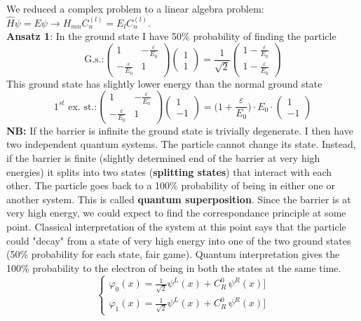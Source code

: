 We reduced a complex problem to a linear algebra problem: $\hat{H}\psi=E\psi \rightarrow H_{mn}C_n^{(l)}=E_lC_n^{(l)}$.\\
\newline
\textbf{Ansatz 1}: In the ground state I have 50\% probability of finding the particle
\[
\text{G.s.:}
\begin{pmatrix}
1 & -\frac{\varepsilon}{E_0}\\
-\frac{\varepsilon}{E_0} & 1
\end{pmatrix}
\begin{pmatrix}
1\\1
\end{pmatrix}
=
\frac{1}{\sqrt{2}}
\begin{pmatrix}
1-\frac{\varepsilon}{E_0}\\1-\frac{\varepsilon}{E_0}
\end{pmatrix}
\]
This ground state has slightly lower energy than the normal ground state
\[
\text{$1^{st}$ ex. st.:}
\begin{pmatrix}
1 & -\frac{\varepsilon}{E_0}\\
-\frac{\varepsilon}{E_0} & 1
\end{pmatrix}
\begin{pmatrix}
1\\-1
\end{pmatrix}
=
\biggl(1+\frac{\varepsilon}{E_0}\biggr)\cdot E_0 \cdot
\begin{pmatrix}
1\\-1
\end{pmatrix}
\]
\textbf{NB:} If the barrier is infinite the ground state is trivially degenerate. I then have two independent quantum systems. The particle cannot change its state. Instead, if the barrier is finite (slightly determined end of the barrier at very high energies) it splits into two states (\textbf{splitting states}) that interact with each other. The particle goes back to a 100\% probability of being in either one or another system. This is called \textbf{quantum superposition}.
\newline
Since the barrier is at very high energy, we could expect to find the correspondance principle at some point. Classical interpretation of the system at this point says that the particle could "decay" from a state of very high energy into one of the two ground states (50\% probability for each state, fair game). Quantum interpretation gives the 100\% probability to the electron of being in both the states at the same time.\\
\[
\begin{cases}
\varphi_0(x) = \frac{1}{\sqrt{2}}\psi^L(x)+C_R^0\,\psi^R(x)]\\
\varphi_1(x) = \frac{1}{\sqrt{2}}\psi^L(x)+C_R^0\,\psi^R(x)]
\end{cases}
\]
